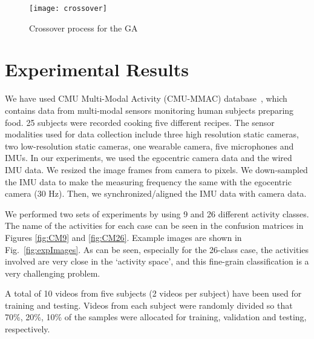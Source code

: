 \documentclass[10pt,twocolumn,letterpaper]{article}
\begin{document}
\begin{figure}[h!]
\vspace{-0.3cm}
  \centering
   \centerline{\texttt{[image: crossover]}}
\caption{{\small{Crossover process for the GA}}}
\label{fig:crossover}
\vspace{-0.35cm}
\end{figure}


\vspace{-0.4cm}
\section{Experimental Results} \label{sec:exp} \vspace{-0.15cm}
We have used CMU Multi-Modal Activity (CMU-MMAC) database~\cite{Fernando2009_MMAC}, which contains data from multi-modal sensors monitoring human subjects preparing food. 25 subjects were recorded cooking five different recipes. The sensor modalities used for data collection include three high resolution static cameras, two low-resolution static cameras, one wearable camera, five microphones and IMUs. In our experiments, we used the egocentric camera data and the wired IMU data. We resized the image frames from camera to  pixels. We down-sampled the IMU data to make the measuring frequency the same with the egocentric camera (30 Hz). Then, we synchronized/aligned the IMU data with camera data.

We performed two sets of experiments by using 9 and 26 different activity classes. The name of the activities for each case can be seen in the confusion matrices in Figures \ref{fig:CM9} and \ref{fig:CM26}. Example images are shown in Fig.~\ref{fig:expImages}. As can be seen, especially for the 26-class case, the activities involved are very close in the `activity space', and this fine-grain classification is a very challenging problem.


A total of 10 videos from five subjects (2 videos per subject) have been used for training and testing. Videos from each subject were randomly divided so that 70\%, 20\%, 10\% of the samples were allocated for training, validation and testing, respectively.
\end{document}
